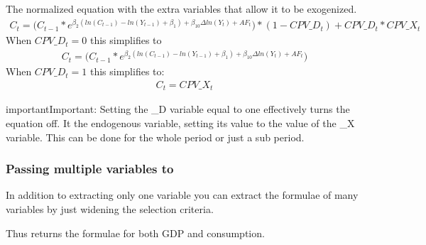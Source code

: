 \documentclass[letterpaper,10pt,english]{jupyterBook}
\begin{document}
\sphinxAtStartPar
The normalized equation with the extra variables that allow it to be exogenized.
\begin{equation*}
\begin{split} C_t= \bigg( C_{t-1} * e^{\beta_2 (ln(C_{t-1})-ln(Y_{t-1}) + \beta_1) + \beta_{10}\Delta ln(Y_t) +AF_t}\bigg) *(1-CPV\_D_t) + CPV\_D_t*CPV\_X_t\end{split}
\end{equation*}
\sphinxAtStartPar
When \(CPV\_D_t=0\) this simplifies to
\begin{equation*}
\begin{split} C_t= \bigg( C_{t-1} * e^{\beta_2 (ln(C_{t-1})-ln(Y_{t-1}) + \beta_1) + \beta_{10}\Delta ln(Y_t) +AF_t}\bigg) \end{split}
\end{equation*}
\sphinxAtStartPar
When \(CPV\_D_t=1\) this simplifies to:
\begin{equation*}
\begin{split} C_t= CPV\_X_t\end{split}
\end{equation*}
\begin{sphinxadmonition}{important}{Important:}
\sphinxAtStartPar
Setting the \_D variable equal to one effectively turns the equation off. It  the  endogenous variable, setting its value to the value of the \_X variable.  This can be done for the whole period or just a sub period.
\end{sphinxadmonition}


\subsubsection{Passing multiple variables to }
\label{\detokenize{content/05_SimpleModel/SimpleModel:passing-multiple-variables-to-frml}}
\sphinxAtStartPar
In addition to extracting only one variable you can extract the formulae of many variables by just widening the selection criteria.

\sphinxAtStartPar
Thus  returns the formulae for both GDP and consumption.
\end{document}
